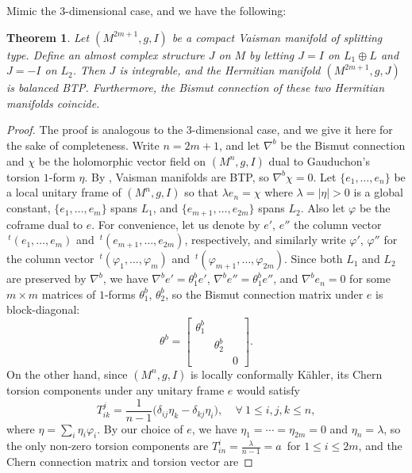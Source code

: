 \documentclass{amsart}
\numberwithin{equation}{section}
\newtheorem{theorem} {Theorem} [section]
\theoremstyle{definition}
\renewcommand{\1}{\mathds{1}}
\renewcommand{\>}{\rightarrow}
\begin{document}
Mimic the $3$-dimensional case, and we have the following:

\begin{theorem} \label{thm6.3}
Let $(M^{2m+1},g,I)$ be a compact Vaisman manifold of splitting type. Define an almost complex structure $J$ on $M$ by letting $J=I$ on $L_1\oplus L$ and $J=-I$ on $L_2$. Then $J$ is integrable, and the Hermitian manifold $(M^{2m+1},g,J)$ is balanced BTP. Furthermore, the Bismut connection of these two Hermitian manifolds coincide.
\end{theorem}

\begin{proof} The proof is analogous to the $3$-dimensional case, and we give it here for the sake of completeness. Write $n=2m+1$, and let $\nabla^b$ be the Bismut connection and $\chi$ be the holomorphic vector field on $(M^n,g,I)$ dual to Gauduchon's torsion $1$-form $\eta$. By \cite{AndV}, Vaisman manifolds are BTP, so $\nabla^b \chi=0$. Let $\{ e_1, \ldots , e_n\}$ be a local unitary frame of $(M^n,g,I)$ so that $\lambda e_n=\chi$ where $\lambda =|\eta|>0$ is a global constant,  $\{ e_1, \ldots , e_m\}$ spans $L_1$, and $\{ e_{m\!+\!1}, \ldots , e_{2m}\}$ spans $L_2$. Also let $\varphi$ be the coframe dual to $e$. For convenience, let us denote by $e'$, $e''$ the column vector $\,^t\!(e_1, \ldots , e_m)$ and $\,^t\!(e_{m\!+\!1}, \ldots , e_{2m})$, respectively, and similarly write $\varphi'$, $\varphi''$ for the column vector $\,^t\!(\varphi_1, \ldots , \varphi_m)$ and $\,^t\!(\varphi_{m\!+\!1}, \ldots , \varphi_{2m})$. Since both $L_1$ and $L_2$ are preserved by $\nabla^b$, we have $\nabla^be'=\theta^b_1e'$, $\nabla^be''=\theta^b_1e''$, and $\nabla^be_n=0$ for some $m\times m$ matrices of $1$-forms $\theta^b_1$, $\theta^b_2$, so the Bismut connection matrix under $e$ is block-diagonal:
$$ \theta^b = \left[ \begin{array}{ccc} \theta^b_1 &&  \\  &\theta^b_2 & \\ &&0 \end{array} \right]. $$
On the other hand, since $(M^{n},g,I)$ is locally conformally K\"ahler, its Chern torsion components under any unitary frame $e$ would satisfy
$$ T^j_{ik} = \frac{1}{n-1} \big( \delta_{ij} \eta_k - \delta_{kj} \eta_i \big), \ \ \ \ \ \forall \ 1\leq i,j,k\leq n, $$
where $\eta = \sum_i \eta_i \varphi_i$. By our choice of $e$, we have $\eta_1=\cdots =\eta_{2m}=0$ and $\eta_n=\lambda$, so the only non-zero torsion components are $T^i_{in}=\frac{\lambda}{n-1}=a\,$ for $1\leq i\leq 2m$, and the Chern connection matrix and torsion vector are

\end{proof}
\end{document}
